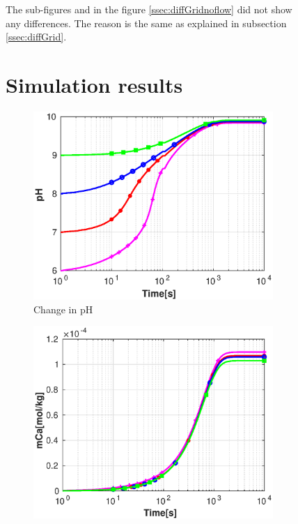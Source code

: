\begin{figure}[!h]The sub-figures  and  in the figure \ref{ssec:diffGridnoflow} did not show any differences. The reason is the same as explained in subsection \ref{ssec:diffGrid}.

\section{\MATLAB Simulation results}

        \centering
    \begin{subfigure}{.5\linewidth}
        \centering
        \includegraphics[width=\textwidth]{PICTURES/without_vel_pH.eps}
        \caption{Change in pH}
        \label{fig:withoutvelpH}       %
    \end{subfigure}%
        \hfill
    \begin{subfigure}{.5\linewidth}
        \centering
        \includegraphics[width=\textwidth]{PICTURES/without_vel_mCa.eps}

\end{subfigure}
\end{figure}
